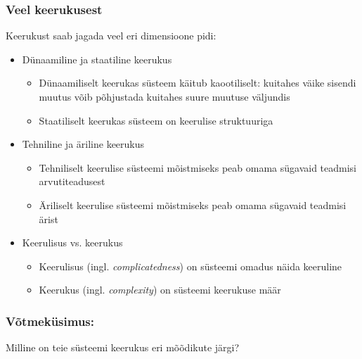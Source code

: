 \begin{frame}[fragile]
  \frametitle{Veel keerukusest}
	Keerukust saab jagada veel eri dimensioone pidi:
	
	\begin{itemize}
		\item Dünaamiline ja staatiline keerukus
			\begin{itemize}
				\item Dünaamiliselt keerukas süsteem käitub kaootiliselt: kuitahes väike sisendi muutus võib põhjustada kuitahes suure muutuse väljundis
				\item Staatiliselt keerukas süsteem on keerulise struktuuriga
			\end{itemize} 
		\item Tehniline ja äriline keerukus
			\begin{itemize}
				\item Tehniliselt keerulise süsteemi mõistmiseks peab omama sügavaid teadmisi arvutiteadusest  
				\item Äriliselt keerulise süsteemi mõistmiseks peab omama sügavaid teadmisi ärist
			\end{itemize} 
		\item Keerulisus vs. keerukus
			\begin{itemize}
				\item Keerulisus (ingl. \emph{complicatedness}) on süsteemi omadus näida keeruline
				\item Keerukus (ingl. \emph{complexity}) on süsteemi keerukuse määr
			\end{itemize} 
	\end{itemize}
\end{frame}

\begin{frame}[fragile]
	\frametitle{Võtmeküsimus:}
	\vfill
	\begin{center}
		Milline on teie süsteemi keerukus eri mõõdikute järgi?  
	\end{center}
	\vfill
\end{frame}



